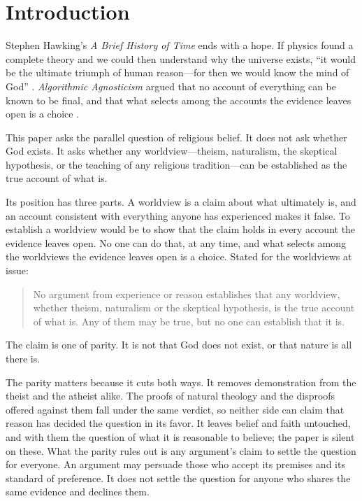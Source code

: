 \section{Introduction}\label{sec:intro}

Stephen Hawking's \emph{A Brief History of Time} ends with a hope. If physics found a complete
theory and we could then understand why the universe exists, ``it would be the ultimate triumph
of human reason---for then we would know the mind of God'' \citep[ch.~11]{hawking1988}.
\emph{Algorithmic Agnosticism} argued that no account of everything can be known to be final, and that what
selects among the accounts the evidence leaves open is a choice \citep[§§3, 9]{taylor2026aa}.

This paper asks the parallel question of religious belief. It does not ask whether God exists. It
asks whether any worldview---theism, naturalism, the skeptical hypothesis, or the teaching of any
religious tradition---can be established as the true account of what is.

Its position has three parts. A worldview is a claim about what ultimately is, and an account
consistent with everything anyone has experienced makes it false. To establish a worldview would be
to show that the claim holds in every account the evidence leaves open. No one can do that, at any
time, and what selects among the worldviews the evidence leaves open is a choice. Stated for the worldviews at issue:

\begin{quote}
No argument from experience or reason establishes that any worldview, whether theism,
naturalism or the skeptical hypothesis, is the true account of what is. Any of them may be true,
but no one can establish that it is.
\end{quote}

The claim is one of parity. It is not that God does not exist, or that nature is all there is.

The parity matters because it cuts both ways. It removes demonstration from the theist and the
atheist alike. The proofs of natural theology and the disproofs offered against them fall under the
same verdict, so neither side can claim that reason has decided the question in its favor. It
leaves belief and faith untouched, and with them the question of what it is reasonable to believe;
the paper is silent on these. What the parity rules out is any argument's claim to settle the question for
everyone. An argument may persuade those who accept its premises and its standard of preference.
It does not settle the question for anyone who shares the same evidence and declines them.


